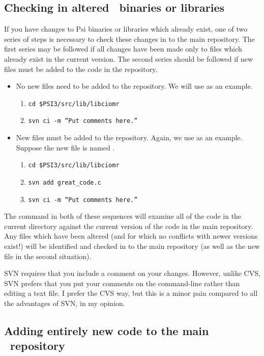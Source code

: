 \subsection{Checking in altered \PSIthree\ binaries or libraries}

If you have changes to Psi binaries or libraries which already exist, one
of two series of steps is necessary to check these changes in to the main
repository. The first series may be followed if all changes have been made
only to files which already exist in the current version. The second series
should be followed if new files must be added to the code in the repository.

\begin{itemize}
\item No new files need to be added to the repository. We will use
 as an example. 
\begin{enumerate}
\item {\tt cd \$PSI3/src/lib/libciomr}
\item {\tt svn ci -m ``Put comments here.''}
\end{enumerate}
\item New files must be added to the repository. Again, we use 
as an example. Suppose the new file is named  .
\begin{enumerate}
\item {\tt cd \$PSI3/src/lib/libciomr} 
\item {\tt svn add great\_code.c} 
\item {\tt svn ci -m ``Put comments here.''}
\end{enumerate}
\end{itemize}

The  command in both of these sequences will examine all
of the code in the current  directory against the
current version of the code in the main repository. Any files which
have been altered (and for which no conflicts with newer versions
exist!) will be identified and checked in to the main repository (as
well as the new file in the second situation).

SVN requires that you include a comment on your changes.  However,
unlike CVS, SVN prefers that you put your comments on the command-line
rather than editing a text file.  I prefer the CVS way, but this is a
minor pain compared to all the advantages of SVN, in my opinion.

\subsection{Adding entirely new code to the main \PSIthree\ repository} 
\label{checkin_new}

